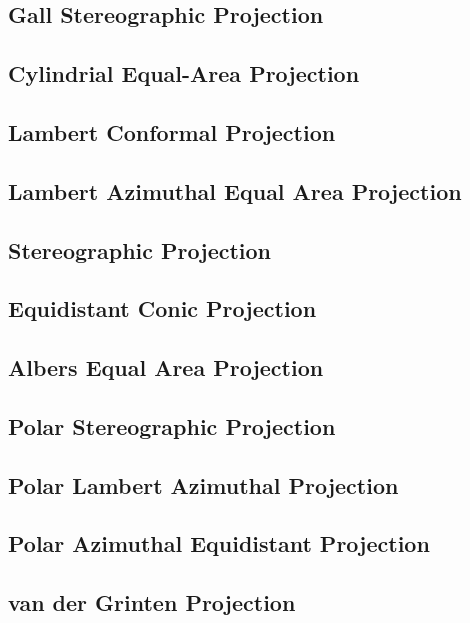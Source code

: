 \subsection{Gall Stereographic Projection}
\label{sec:2.20}
\subsection{Cylindrial Equal-Area Projection}
\label{sec:2.21}
\subsection{Lambert Conformal Projection}
\label{sec:2.22}
\subsection{Lambert Azimuthal Equal Area Projection}
\label{sec:2.23}
\subsection{Stereographic Projection}
\label{sec:2.24}
\subsection{Equidistant Conic Projection}
\label{sec:2.25}
\subsection{Albers Equal Area Projection}
\label{sec:2.26}
\subsection{Polar Stereographic Projection}
\label{sec:2.27}
\subsection{Polar Lambert Azimuthal Projection}
\label{sec:2.28}
\subsection{Polar Azimuthal Equidistant Projection}
\label{sec:2.29}
\subsection{van der Grinten Projection}
\label{sec:2.30}
